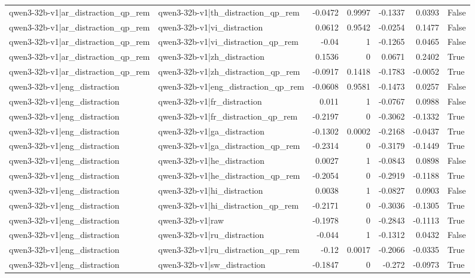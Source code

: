 \begin{table}
\begin{tabular}{l l r r r r l}
qwen3-32b-v1|ar_distraction_qp_rem & qwen3-32b-v1|th_distraction_qp_rem & -0.0472 & 0.9997 & -0.1337 & 0.0393 & False \\
qwen3-32b-v1|ar_distraction_qp_rem & qwen3-32b-v1|vi_distraction & 0.0612 & 0.9542 & -0.0254 & 0.1477 & False \\
qwen3-32b-v1|ar_distraction_qp_rem & qwen3-32b-v1|vi_distraction_qp_rem & -0.04 & 1 & -0.1265 & 0.0465 & False \\
qwen3-32b-v1|ar_distraction_qp_rem & qwen3-32b-v1|zh_distraction & 0.1536 & 0 & 0.0671 & 0.2402 & True \\
qwen3-32b-v1|ar_distraction_qp_rem & qwen3-32b-v1|zh_distraction_qp_rem & -0.0917 & 0.1418 & -0.1783 & -0.0052 & True \\
qwen3-32b-v1|eng_distraction & qwen3-32b-v1|eng_distraction_qp_rem & -0.0608 & 0.9581 & -0.1473 & 0.0257 & False \\
qwen3-32b-v1|eng_distraction & qwen3-32b-v1|fr_distraction & 0.011 & 1 & -0.0767 & 0.0988 & False \\
qwen3-32b-v1|eng_distraction & qwen3-32b-v1|fr_distraction_qp_rem & -0.2197 & 0 & -0.3062 & -0.1332 & True \\
qwen3-32b-v1|eng_distraction & qwen3-32b-v1|ga_distraction & -0.1302 & 0.0002 & -0.2168 & -0.0437 & True \\
qwen3-32b-v1|eng_distraction & qwen3-32b-v1|ga_distraction_qp_rem & -0.2314 & 0 & -0.3179 & -0.1449 & True \\
qwen3-32b-v1|eng_distraction & qwen3-32b-v1|he_distraction & 0.0027 & 1 & -0.0843 & 0.0898 & False \\
qwen3-32b-v1|eng_distraction & qwen3-32b-v1|he_distraction_qp_rem & -0.2054 & 0 & -0.2919 & -0.1188 & True \\
qwen3-32b-v1|eng_distraction & qwen3-32b-v1|hi_distraction & 0.0038 & 1 & -0.0827 & 0.0903 & False \\
qwen3-32b-v1|eng_distraction & qwen3-32b-v1|hi_distraction_qp_rem & -0.2171 & 0 & -0.3036 & -0.1305 & True \\
qwen3-32b-v1|eng_distraction & qwen3-32b-v1|raw & -0.1978 & 0 & -0.2843 & -0.1113 & True \\
qwen3-32b-v1|eng_distraction & qwen3-32b-v1|ru_distraction & -0.044 & 1 & -0.1312 & 0.0432 & False \\
qwen3-32b-v1|eng_distraction & qwen3-32b-v1|ru_distraction_qp_rem & -0.12 & 0.0017 & -0.2066 & -0.0335 & True \\
qwen3-32b-v1|eng_distraction & qwen3-32b-v1|sw_distraction & -0.1847 & 0 & -0.272 & -0.0973 & True \\

\end{tabular}
\end{table}
